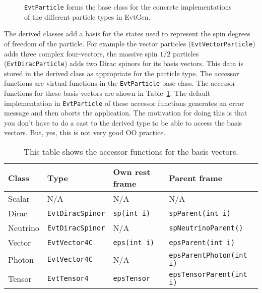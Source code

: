 \begin{figure}[tb]
\begin{center}
\end{center}
\caption{{\tt EvtParticle} forms the base class for the concrete 
implementations of the different particle types in EvtGen.}
\label{fig:evtparticle}
\end{figure}

The derived classes add a basis for the states used
to represent the spin degrees of freedom of the particle. For
example the vector particles ({\tt EvtVectorParticle}) adds three
complex four-vectors, the massive spin $1/2$ particles 
({\tt EvtDiracParticle}) adds two Dirac spinors for its basis
vectors. This data is stored in the derived class as appropriate
for the particle type. The accessor functions are virtual
functions in the {\tt EvtParticle} base class. The accessor
functions for these basis vectors are shown in Table~\ref{tab:accessbasis}.
The default implementation in {\tt EvtParticle} of these accessor functions
generates an error message and then aborts the application. The motivation
for doing this is that you don't have to do a cast to the derived type
to be able to access the basis vectors. But, yes, this is not very
good OO practice.

\begin{table}[htbp]
\begin{center}
\begin{tabular}{llll} \hline
Class     &  Type &  Own rest frame   &  Parent frame \\ \hline
Scalar   &  N/A    &   N/A  &    N/A \\
Dirac    & {\tt EvtDiracSpinor} & {\tt sp(int i)}   &  {\tt spParent(int i) } \\
Neutrino & {\tt EvtDiracSpinor} & N/A   &  {\tt spNeutrinoParent() } \\
Vector   & {\tt EvtVector4C} & {\tt eps(int i)}   &  {\tt epsParent(int i) } \\
Photon   & {\tt EvtVector4C} & N/A   &  {\tt epsParentPhoton(int i) } \\
Tensor   & {\tt EvtTensor4} & {\tt epsTensor}  &  {\tt epsTensorParent(int i) } \\ \hline
\end{tabular}
\caption{This table shows the accessor functions for the basis
vectors.
\label{tab:accessbasis}}
\end{center}
\end{table}

